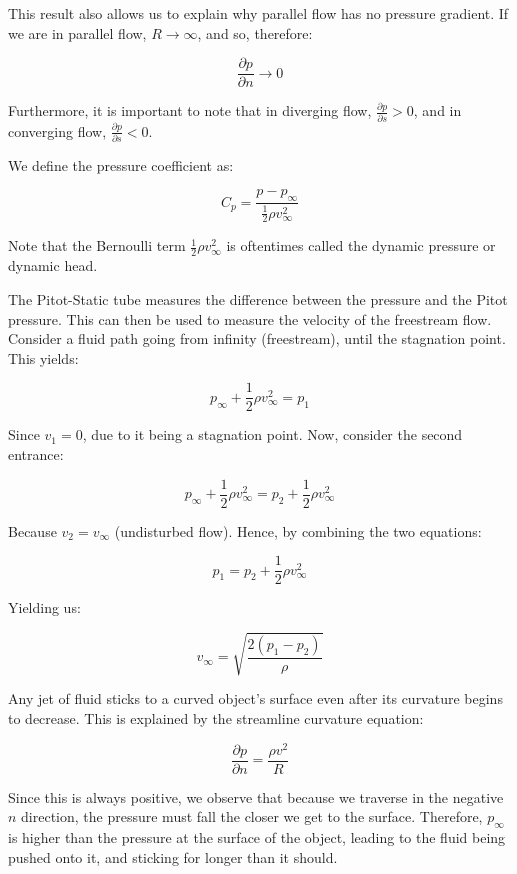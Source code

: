 \documentclass{article}
\begin{document}
This result also allows us to explain why parallel flow has no pressure gradient. If we are in parallel flow, $R \to \infty$, and so, therefore:

\[ \frac{\partial p}{\partial n} \to 0 \]

Furthermore, it is important to note that in diverging flow, $\frac{\partial p}{\partial s} > 0$, and in converging flow, $\frac{\partial p}{\partial s} < 0$.

\begin{definition}
    We define the pressure coefficient as:

    \[ C_p = \frac{p - p_\infty}{\frac{1}{2}\rho v_\infty^2} \]

    Note that the Bernoulli term $\frac{1}{2}\rho v_\infty^2$ is oftentimes called the dynamic pressure or dynamic head.
\end{definition}

\begin{proposition}
    The Pitot-Static tube measures the difference between the pressure and the Pitot pressure. This can then be used to measure the velocity of the freestream flow. Consider a fluid path going from infinity (freestream), until the stagnation point. This yields:

    \[ p_\infty + \frac{1}{2}\rho v_\infty^2 = p_1 \]

    Since $v_1 = 0$, due to it being a stagnation point. Now, consider the second entrance:

    \[ p_\infty + \frac{1}{2}\rho v_\infty^2 = p_2 + \frac{1}{2}\rho v_\infty ^2 \]

    Because $v_2 = v_\infty$ (undisturbed flow). Hence, by combining the two equations:

    \[ p_1 = p_2 + \frac{1}{2}\rho v_\infty ^2 \]

    Yielding us:

    \[ v_\infty = \sqrt{\frac{2(p_1 - p_2)}{\rho}} \]
\end{proposition}

\begin{proposition}
    Any jet of fluid sticks to a curved object's surface even after its curvature begins to decrease. This is explained by the streamline curvature equation:

    \[ \frac{\partial p}{\partial n} = \frac{\rho v^2}{R} \]

    Since this is always positive, we observe that because we traverse in the negative $n$ direction, the pressure must fall the closer we get to the surface. Therefore, $p_\infty$ is higher than the pressure at the surface of the object, leading to the fluid being pushed onto it, and sticking for longer than it should.
\end{proposition}
\end{document}

